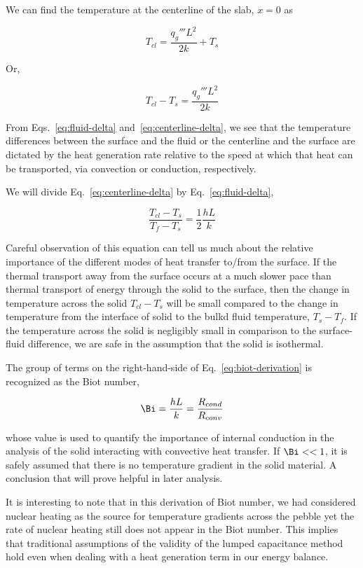 We can find the temperature at the centerline of the slab, $x = 0$ as

\begin{equation}
	T_{cl} = \frac{q_g''' L^2}{2k} + T_s
\end{equation}

Or,

\begin{equation}\label{eq:centerline-delta}
	T_{cl} - T_s = \frac{q_g''' L^2}{2k}
\end{equation}

From Eqs.~\ref{eq:fluid-delta} and~\ref{eq:centerline-delta}, we see that the temperature differences between the surface and the fluid or the centerline and the surface are dictated by the heat generation rate relative to the speed at which that heat can be transported, via convection or conduction, respectively.

We will divide Eq.~\ref{eq:centerline-delta} by Eq.~\ref{eq:fluid-delta},

\begin{equation}\label{eq:biot-derivation}
	\frac{T_{cl} - T_s}{T_f-T_s} = \frac{1}{2}\frac{hL}{k}
\end{equation}

Careful observation of this equation can tell us much about the relative importance of the different modes of heat transfer to/from the surface. If the thermal transport away from the surface occurs at a much slower pace than thermal transport of energy through the solid to the surface, then the change in temperature across the solid $T_{cl}-T_{s}$ will be small compared to the change in temperature from the interface of solid to the bulkd fluid temperature, $T_{s}-T_f$. If the temperature across the solid is negligibly small in comparison to the surface-fluid difference, we are safe in the assumption that the solid is isothermal.

The group of terms on the right-hand-side of Eq.~\ref{eq:biot-derivation} is recognized as the Biot number,

\begin{equation}\label{eq:biot-number}
	\Bi=\frac{hL}{k}=\frac{R_{cond}}{R_{conv}}
\end{equation}

whose value is used to quantify the importance of internal conduction in the analysis of the solid interacting with convective heat transfer. If $\Bi<<1$, it is safely assumed that there is no temperature gradient in the solid material. A conclusion that will prove helpful in later analysis.

It is interesting to note that in this derivation of Biot number, we had considered nuclear heating as the source for temperature gradients across the pebble yet the rate of nuclear heating still does not appear in the Biot number. This implies that traditional assumptions of the validity of the lumped capacitance method hold even when dealing with a heat generation term in our energy balance.

